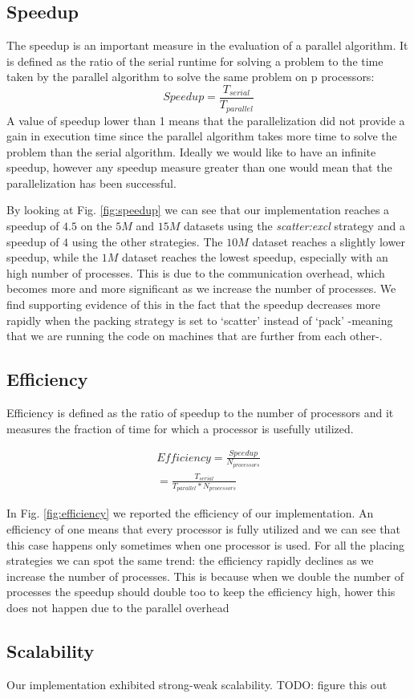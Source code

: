 \subsection{Speedup}
The speedup is an important measure in the evaluation of a parallel algorithm.
It is defined as the ratio of the serial runtime for solving a problem to the time taken by the
parallel algorithm to solve the same problem on p processors:
\begin{equation}
    Speedup = \frac{T_{serial}}{T_{parallel}}
\end{equation}
A value of speedup lower than 1 means that the parallelization did not provide a gain in execution time
since the parallel algorithm takes more time to solve the problem than the serial algorithm.
Ideally we would like to have an infinite speedup, however any speedup measure greater than one would
mean that the parallelization has been successful.

By looking at Fig. \ref{fig:speedup} we can see that our implementation reaches a speedup of $4.5$ on the
$5M$ and $15M$ datasets using the \textit{scatter:excl} strategy and a speedup of $4$ using the other strategies.
The $10M$ dataset reaches a slightly lower speedup, while the $1M$ dataset reaches the lowest speedup, especially
with an high number of processes. This is due to the communication overhead, which becomes more and more significant as we increase the number of processes. We find supporting evidence of this in the fact that the speedup decreases more rapidly when the packing strategy is set to `scatter' instead of `pack' -meaning that we are running the code on machines that are further from each other-.

\subsection{Efficiency}
Efficiency is defined as the ratio of speedup to the
number of processors and it measures the fraction of
time for which a processor is usefully utilized.

\begin{equation}
    \begin{split}
        Efficiency = \frac{Speedup}{N_{processors}} \\
        = \frac{T_{serial}}{T_{parallel} * N_{processors}}
    \end{split}
\end{equation}

In Fig. \ref{fig:efficiency} we reported the efficiency of our implementation.
An efficiency of one means that every processor is fully utilized and we can see that
this case happens only sometimes when one processor is used.
For all the placing strategies we can spot the same trend: the efficiency rapidly declines as we
increase the number of processes. This is because when we double the number of processes the speedup should
double too to keep the efficiency high, hower this does not happen due to the parallel overhead


\subsection{Scalability}
Our implementation exhibited {strong-weak} scalability. TODO: figure this out

